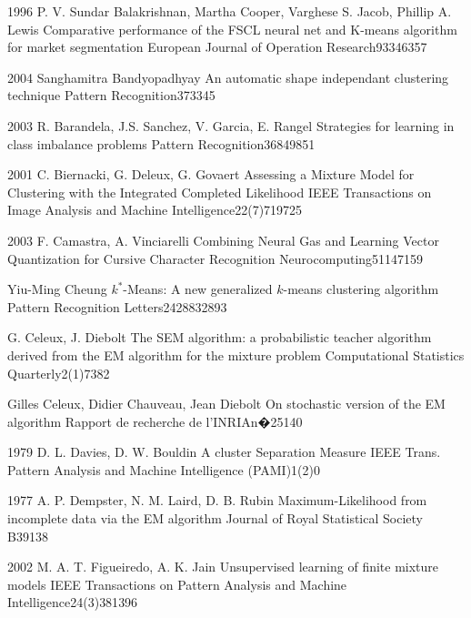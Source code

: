 
 {1996} {P. V. Sundar Balakrishnan, Martha Cooper, Varghese S. Jacob, Phillip A. Lewis}
{Comparative performance of the FSCL neural net and K-means algorithm for market segmentation}
{European Journal of Operation Research}{93}{346}{357}

 {2004} {Sanghamitra Bandyopadhyay}
{An automatic shape independant clustering technique}
{Pattern Recognition}{37}{33}{45}

 {2003} {R. Barandela, J.S. Sanchez, V. Garcia, E. Rangel}
{Strategies for learning in class imbalance problems}
{Pattern Recognition}{36}{849}{851}

 {2001} {C. Biernacki, G. Deleux, G. Govaert}
{Assessing a Mixture Model for Clustering with the Integrated Completed Likelihood}
{IEEE Transactions on Image Analysis and Machine Intelligence}{22(7)}{719}{725}

 {2003} {F. Camastra, A. Vinciarelli}
{Combining Neural Gas and Learning Vector Quantization for Cursive Character Recognition}
{Neurocomputing}{51}{147}{159}

 {Yiu-Ming Cheung}
{$k^*$-Means: A new generalized $k$-means clustering algorithm}
{Pattern Recognition Letters}{24}{2883}{2893}

 {G. Celeux, J. Diebolt}
{The SEM algorithm: a probabilistic teacher algorithm derived from the EM algorithm for the mixture problem}
{Computational Statistics Quarterly}{2(1)}{73}{82}

 {Gilles Celeux, Didier Chauveau, Jean Diebolt}
{On stochastic version of the EM algorithm}
{Rapport de recherche de l'INRIA}{n�2514}{0}{}

 {1979} {D. L. Davies, D. W. Bouldin}
{A cluster Separation Measure}
{IEEE Trans. Pattern Analysis and Machine Intelligence (PAMI)}{1(2)}{0}{}

 {1977} {A. P. Dempster, N. M. Laird, D. B. Rubin}
{Maximum-Likelihood from incomplete data via the EM algorithm}
{Journal of Royal Statistical Society B}{39}{1}{38}

 {2002} {M. A. T. Figueiredo, A. K. Jain}
{Unsupervised learning of finite mixture models}
{IEEE Transactions on Pattern Analysis and Machine Intelligence}{24(3)}{381}{396}

